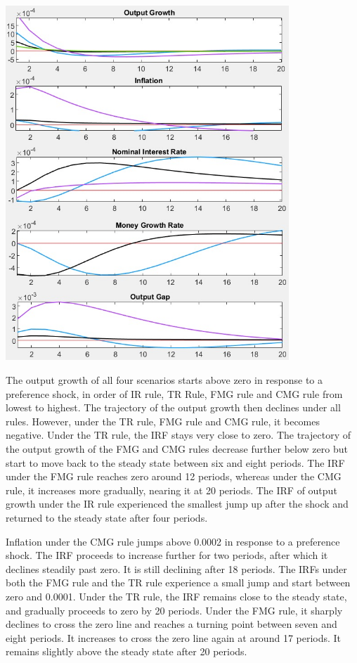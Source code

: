\documentclass[11pt,preprint, authoryear]{elsarticle}
\let\origfigure\figure
\let\endorigfigure\endfigure
\renewenvironment{figure}[1][2] {
    \expandafter\origfigure\expandafter[H]
} {
    \endorigfigure
}
\numberwithin{equation}{section}
\numberwithin{figure}{section}
\numberwithin{table}{section}
\begin{document}
\begin{figure}
\centering
\includegraphics[width=0.8\textwidth,height=0.6\textheight]{./figures/preference-shock.jpeg}
\caption{Plots of Impulse Response Functions for a Preference Shock}
\end{figure}

The output growth of all four scenarios starts above zero in response to
a preference shock, in order of IR rule, TR Rule, FMG rule and CMG rule
from lowest to highest. The trajectory of the output growth then
declines under all rules. However, under the TR rule, FMG rule and CMG
rule, it becomes negative. Under the TR rule, the IRF stays very close
to zero. The trajectory of the output growth of the FMG and CMG rules
decrease further below zero but start to move back to the steady state
between six and eight periods. The IRF under the FMG rule reaches zero
around 12 periods, whereas under the CMG rule, it increases more
gradually, nearing it at 20 periods. The IRF of output growth under the
IR rule experienced the smallest jump up after the shock and returned to
the steady state after four periods.

Inflation under the CMG rule jumps above 0.0002 in response to a
preference shock. The IRF proceeds to increase further for two periods,
after which it declines steadily past zero. It is still declining after
18 periods. The IRFs under both the FMG rule and the TR rule experience
a small jump and start between zero and 0.0001. Under the TR rule, the
IRF remains close to the steady state, and gradually proceeds to zero by
20 periods. Under the FMG rule, it sharply declines to cross the zero
line and reaches a turning point between seven and eight periods. It
increases to cross the zero line again at around 17 periods. It remains
slightly above the steady state after 20 periods.
\end{document}
